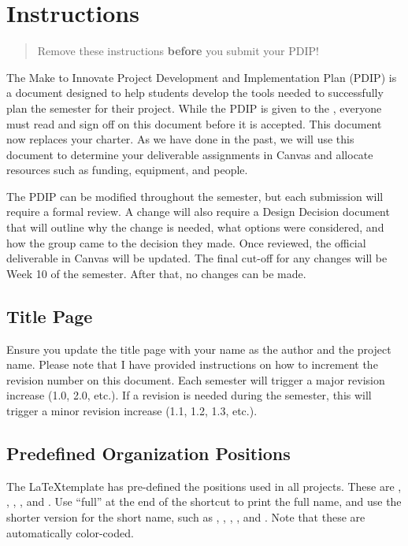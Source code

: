 
\section{Instructions}

\begin{quote}
Remove these instructions \textbf{before} you submit your PDIP!
\end{quote}

The Make to Innovate Project Development and Implementation Plan (PDIP) is a document designed to help students develop the tools needed to successfully plan the semester for their project. While the PDIP is given to the \pmgfull{}, everyone must read and sign off on this document before it is accepted. This document now replaces your charter. As we have done in the past, we will use this document to determine your deliverable assignments in Canvas and allocate resources such as funding, equipment, and people. 

The PDIP can be modified throughout the semester, but each submission will require a formal review. A change will also require a Design Decision document that will outline why the change is needed, what options were considered, and how the group came to the decision they made. Once reviewed, the official deliverable in Canvas will be updated. The final cut-off for any changes will be Week 10 of the semester. After that, no changes can be made.

\subsection{Title Page}
Ensure you update the title page with your name as the author and the project name. Please note that I have provided instructions on how to increment the revision number on this document. Each semester will trigger a major revision increase (1.0, 2.0, etc.). If a revision is needed during the semester, this will trigger a minor revision increase (1.1, 1.2, 1.3, etc.). 

\subsection{Predefined Organization Positions}
The \LaTeX template has pre-defined the positions used in all projects. These are \pmgfull{}, \tlfull{}, \tmfull{}, \sofull{}, and \tcfull{}. Use ``full'' at the end of the shortcut to print the full name, and use the shorter version for the short name, such as \pmg{}, \tl{}, \tm{}, \so{}, and \tc{}. Note that these are automatically color-coded. 

